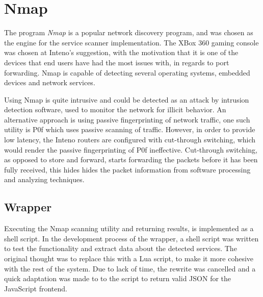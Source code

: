 \documentclass[a4paper,11pt,makeidx]{kth-bcs}
\begin{document}

\section{Nmap}
The program \emph{Nmap} is a popular network discovery program, and was chosen as the engine for the service scanner implementation.
The XBox 360 gaming console was chosen at Inteno's suggestion, with the motivation that it is one of the devices that end users have had the most issues with, in regards to port forwarding.
Nmap is capable of detecting several operating systems, embedded devices and network services.

Using Nmap is quite intrusive and could be detected as an attack by intrusion detection software, used to monitor the network for illicit behavior.
An alternative approach is using passive fingerprinting of network traffic, one such utility is P0f which uses passive scanning of traffic.\cite{p0f}
However, in order to provide low latency, the Inteno routers are configured with cut-through switching, which would render the passive fingerprinting of P0f ineffective.
Cut-through switching, as opposed to store and forward, starts forwarding the packets before it has been fully received, this hides hides the packet information from software processing and analyzing techniques.

\subsection{Wrapper}
Executing the Nmap scanning utility and returning results, is implemented as a shell script.
In the development process of the wrapper, a shell script was written to test the functionality and extract data about the detected services.
The original thought was to replace this with a Lua script, to make it more cohesive with the rest of the system.
Due to lack of time, the rewrite was cancelled and a quick adaptation was made to to the script to return valid JSON for the JavaScript frontend.
\end{document}
